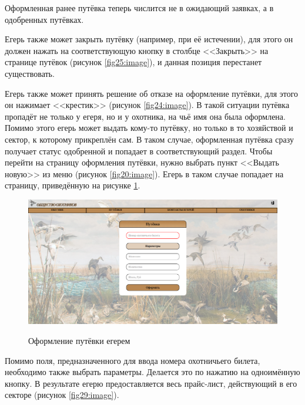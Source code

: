 	Оформленная ранее путёвка теперь числится не в ожидающий заявках, а в одобренных путёвках.
	
	Егерь также может закрыть путёвку (например, при её истечении), для этого он должен нажать на соответствующую кнопку в столбце <<Закрыть>> на странице путёвок (рисунок \ref{fig25:image}), и данная позиция перестанет существовать.
	
	Егерь также может принять решение об отказе на оформление путёвки, для этого он нажимает <<крестик>> (рисунок \ref{fig24:image}). В такой ситуации путёвка пропадёт не только у егеря, но и у охотника, на чьё имя она была оформлена.\\

	Помимо этого егерь может выдать кому-то путёвку, но только в то хозяйствой и сектор, к которому прикреплён сам. В таком случае, оформленная путёвка сразу получает статус одобренной и попадает в соответствующий раздел. Чтобы перейти на страницу оформления путёвки, нужно выбрать пункт <<Выдать новую>> из меню (рисунок \ref{fig20:image}). Егерь в таком случае попадает на страницу, приведённую на рисунке \ref{fig28:image}.

	\begin{figure}[h]
		\centering
		\begin{center}
			{\includegraphics[scale=0.34]{schemes/screens/create_huntsman.png}}
			\caption{Оформление путёвки егерем}
			\label{fig28:image}
		\end{center}
	\end{figure}
	\newpage

	Помимо поля, предназначенного для ввода номера охотничьего билета, необходимо также выбрать параметры. Делается это по нажатию на одноимённую кнопку. В результате егерю предоставляется весь прайс-лист, действующий в его секторе (рисунок \ref{fig29:image}).
	
